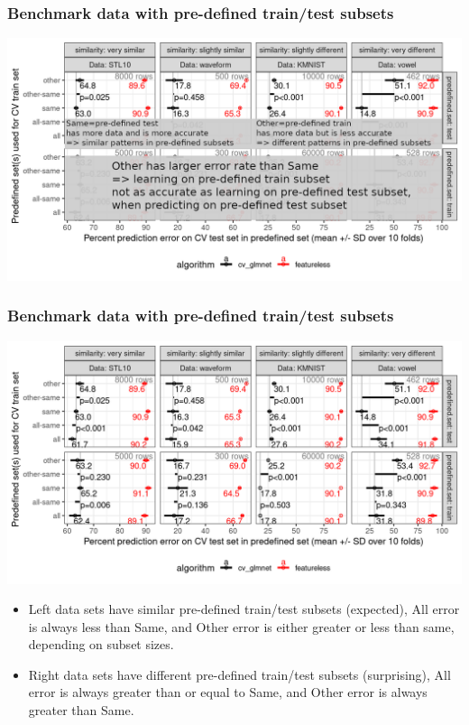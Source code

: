 \documentclass[t]{beamer}
\begin{document}
\begin{frame}
  \frametitle{Benchmark data with pre-defined train/test subsets}
  \includegraphics[width=\textwidth]{data_Classif_batchmark_registry_glmnet_featureless_mean_sd_other_test}
\end{frame}
 
\begin{frame}
  \frametitle{Benchmark data with pre-defined train/test subsets}
  \includegraphics[width=\textwidth]{data_Classif_batchmark_registry_glmnet_featureless_mean_sd}
  \vskip -0.5cm
  \begin{itemize}
  \item Left data sets have similar pre-defined train/test subsets (expected), All error is always less than Same, and Other error is either greater or less than same, depending on subset sizes. 
  \item Right data sets have different pre-defined train/test subsets (surprising), All error is always greater than or equal to Same, and Other error is always greater than Same.
  \end{itemize}
\end{frame}
\end{document}
